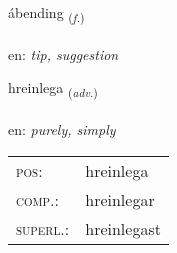 \documentclass[frontgrid, backgrid]{flacards}\usepackage[]{graphicx}\usepackage[]{xcolor}
\begin{document}
\renewcommand{\blhead}{\vskip5pt {\small\bfseries\footnotesize Nafnorð | Noun }}
\renewcommand{\bcfoot}{\vskip5pt \hspace{2pt}{\small\bfseries\footnotesize 3K}}


{ábending \small{\textsubscript{(\textit{f.})}} \\[1ex] %
\textphonetic{[auːpɛntiŋk]} \\
en: \emph{tip, suggestion} \\  [2ex]
\renewcommand*{\arraystretch}{0.8}
}

\renewcommand{\flhead}{\vskip5pt \fboxsep=0pt {\small\bfseries\footnotesize Atviksorð | Adverb}}
\renewcommand{\fcfoot}{\vskip5pt \fboxsep=0pt \hspace{2pt}{\small\bfseries\footnotesize 3K}}

\renewcommand{\blhead}{\vskip5pt {\small\bfseries\footnotesize Atviksorð | Adverb }}
\renewcommand{\bcfoot}{\vskip5pt \hspace{2pt}{\small\bfseries\footnotesize 3K}}


{hreinlega \small{\textsubscript{(\textit{adv.})}} \\[1ex] %
\textphonetic{[r̥eiːnlɛɣa]} \\
en: \emph{purely, simply} \\  [2ex]
\renewcommand*{\arraystretch}{0.8}
\begin{tabular}{ll}
\textsc{pos}: & hreinlega \\ 
\textsc{comp.}: & hreinlegar \\ 
\textsc{superl.}: & hreinlegast \\
\end{tabular}
}

\renewcommand{\flhead}{\vskip5pt \fboxsep=0pt {\small\bfseries\footnotesize Lýsingarorð | Adjective}}
\renewcommand{\fcfoot}{\vskip5pt \fboxsep=0pt \hspace{2pt}{\small\bfseries\footnotesize 3K}}
\end{document}
